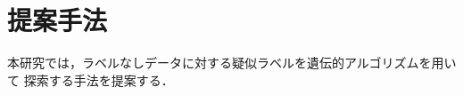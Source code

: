 
\newpage
\changeindent{0cm}
\section{提案手法}
\changeindent{2cm}
本研究では，ラベルなしデータに対する疑似ラベルを遺伝的アルゴリズムを用いて
探索する手法を提案する．
